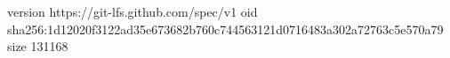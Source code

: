 version https://git-lfs.github.com/spec/v1
oid sha256:1d12020f3122ad35e673682b760c744563121d0716483a302a72763c5e570a79
size 131168
